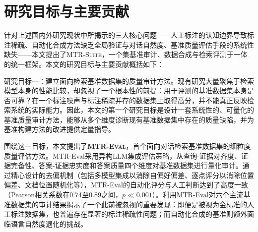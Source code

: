 

\section{研究目标与主要贡献}

针对上述国内外研究现状中所揭示的三大核心问题——人工标注的认知边界导致标注稀疏、自动化合成方法缺乏全局验证与对话自然度、基准质量评估手段的系统性缺失——本文提出了\textsc{MTR-Suite}，一个集基准审计、数据合成与检索评测于一体的统一框架。本文的研究目标与主要贡献概括如下：

研究目标一：建立面向检索基准数据集的质量审计方法。现有研究大量聚焦于检索模型本身的性能比较，却忽视了一个根本性的前提：用于评测的基准数据集本身是否可靠？在一个标注噪声与标注稀疏并存的数据集上取得高分，并不能真正反映检索系统的实际能力。因此，本文的第一个研究目标是设计一套系统性的、可量化的基准质量审计方法，能够从多个维度诊断现有基准数据集中存在的质量缺陷，并为基准构建方法的改进提供定量指导。

围绕这一目标，本文提出了\textbf{\textsc{MTR-Eval}}，首个面向对话检索基准数据集的细粒度质量评估方法。MTR-Eval采用异构LLM集成评估策略，从查询-证据对齐度、证据完备性、答案-证据忠实度和答案质量四个维度对基准数据集进行量化审计。通过精心设计的去偏机制（包括多模型集成以消除自偏好偏差、逐点评分以消除位置偏差、文档位置随机化等），MTR-Eval的自动化评分与人工判断达到了高度一致（Pearson相关系数在0.74至0.89之间，$p \ll 0.001$）。利用MTR-Eval对六个主流基准数据集的审计结果揭示了一个此前被忽视的重要发现：即便是被视为金标准的人工标注数据集，也普遍存在显著的标注稀疏性问题；而自动化合成的基准则额外面临语言自然度退化的挑战。

